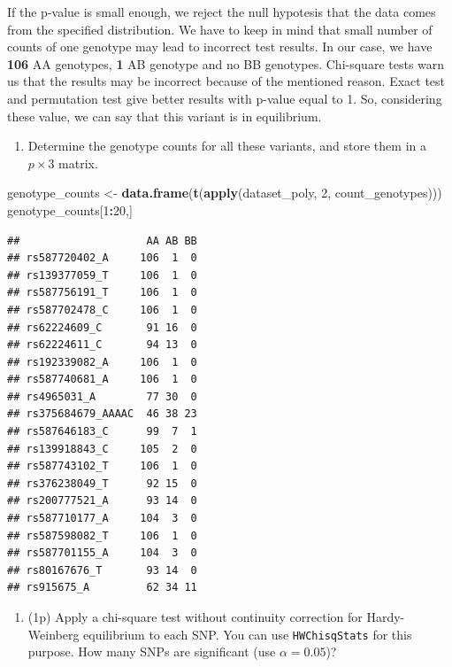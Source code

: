 \documentclass[
]{article}
\newenvironment{Shaded}{\begin{snugshade}}{\end{snugshade}}
\newcommand{\DecValTok}[1]{\textcolor[rgb]{0.00,0.00,0.81}{#1}}
\newcommand{\KeywordTok}[1]{\textcolor[rgb]{0.13,0.29,0.53}{\textbf{#1}}}
\newcommand{\NormalTok}[1]{#1}
\newcommand{\OperatorTok}[1]{\textcolor[rgb]{0.81,0.36,0.00}{\textbf{#1}}}
\newcommand{\StringTok}[1]{\textcolor[rgb]{0.31,0.60,0.02}{#1}}
\providecommand{\tightlist}{%
  \setlength{\itemsep}{0pt}\setlength{\parskip}{0pt}}
\begin{document}
If the p-value is small enough, we reject the null hypotesis that the
data comes from the specified distribution. We have to keep in mind that
small number of counts of one genotype may lead to incorrect test
results. In our case, we have \textbf{106} AA genotypes, \textbf{1} AB
genotype and no BB genotypes. Chi-square tests warn us that the results
may be incorrect because of the mentioned reason. Exact test and
permutation test give better results with p-value equal to 1. So,
considering these value, we can say that this variant is in equilibrium.

\begin{enumerate}
\def\labelenumi{\arabic{enumi}.}
\setcounter{enumi}{3}
\tightlist
\item
  Determine the genotype counts for all these variants, and store them
  in a \(p \times 3\) matrix.
\end{enumerate}

\begin{Shaded}
\begin{Highlighting}[]
\NormalTok{genotype_counts <-}\StringTok{ }\KeywordTok{data.frame}\NormalTok{(}\KeywordTok{t}\NormalTok{(}\KeywordTok{apply}\NormalTok{(dataset_poly, }\DecValTok{2}\NormalTok{, count_genotypes)))}
\NormalTok{genotype_counts[}\DecValTok{1}\OperatorTok{:}\DecValTok{20}\NormalTok{,]}
\end{Highlighting}
\end{Shaded}

\begin{verbatim}
##                    AA AB BB
## rs587720402_A     106  1  0
## rs139377059_T     106  1  0
## rs587756191_T     106  1  0
## rs587702478_C     106  1  0
## rs62224609_C       91 16  0
## rs62224611_C       94 13  0
## rs192339082_A     106  1  0
## rs587740681_A     106  1  0
## rs4965031_A        77 30  0
## rs375684679_AAAAC  46 38 23
## rs587646183_C      99  7  1
## rs139918843_C     105  2  0
## rs587743102_T     106  1  0
## rs376238049_T      92 15  0
## rs200777521_A      93 14  0
## rs587710177_A     104  3  0
## rs587598082_T     106  1  0
## rs587701155_A     104  3  0
## rs80167676_T       93 14  0
## rs915675_A         62 34 11
\end{verbatim}

\begin{enumerate}
\def\labelenumi{\arabic{enumi}.}
\setcounter{enumi}{4}
\tightlist
\item
  (1p) Apply a chi-square test without continuity correction for
  Hardy-Weinberg equilibrium to each SNP. You can use
  \texttt{HWChisqStats} for this purpose. How many SNPs are significant
  (use \(\alpha = 0.05\))?
\end{enumerate}
\end{document}
